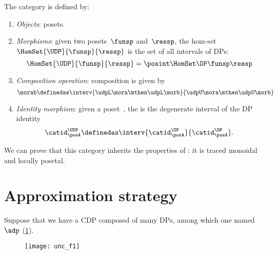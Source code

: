 \begin{ctdefinition}
    \label{def:UDP}
    The category \UDP is defined by:
    \begin{enumerate}
        \item \emph{Objects}: posets.
        \item \emph{Morphisms}: given two posets~$\funsp$ and~$\ressp$, the hom-set~$\HomSet{\UDP}{\funsp}{\ressp}$ is the set of all intervals of DPs:
              \begin{equation}
                  \HomSet{\UDP}{\funsp}{\ressp}=\posint \HomSet\DP\funsp\ressp
              \end{equation}
        \item \emph{Composition operation}: composition is given by
              \begin{equation}
                  \morab \definedas \interv{ \udpL\mora\mthen \udpL\morb}{\udpU\mora\mthen \udpU\morb}
              \end{equation}
        \item \emph{Identity morphism}: given a poset~\posA, the  is the degenerate interval of the DP identity
              \begin{equation}
                  \catid^{\UDP}_{\posA} \definedas \interv{\catid^{\DP}_\posA}{\catid^{\DP}_\posA}.
              \end{equation}
    \end{enumerate}
\end{ctdefinition}

We can prove that this category inherits the properties of \DP: it is traced monoidal and locally posetal.


\section{Approximation strategy}
\label{sec:Approximation-results}


Suppose that we have a CDP composed of many DPs, among which one named~$\adp$ (\cref{fig:consider1}).

\begin{figure}[h!]
    \texttt{[image: unc\_f1]}
    \caption{}
    \label{fig:consider1}
\end{figure}

